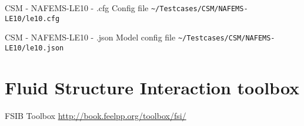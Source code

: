 \begin{frame}{CSM - NAFEMS-LE10 - .cfg}
Config file \lstinline{~/Testcases/CSM/NAFEMS-LE10/le10.cfg}

\framebreak
\end{frame}


\begin{frame}{CSM - NAFEMS-LE10 - .json}
Model config file \lstinline{~/Testcases/CSM/NAFEMS-LE10/le10.json}

\framebreak
\end{frame}


















\section[FSI]{Fluid Structure Interaction toolbox}

\begin{frame}[standout]{FSIB Toolbox}
  \url{http://book.feelpp.org/toolbox/fsi/}
\end{frame}



